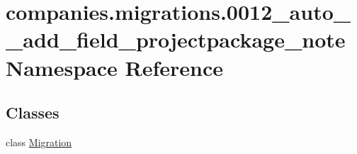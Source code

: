 \hypertarget{namespacecompanies_1_1migrations_1_10012__auto____add__field__projectpackage__note}{\section{companies.\-migrations.0012\-\_\-auto\-\_\-\-\_\-add\-\_\-field\-\_\-projectpackage\-\_\-note Namespace Reference}
\label{namespacecompanies_1_1migrations_1_10012__auto____add__field__projectpackage__note}
}
\subsection*{Classes}
\begin{DoxyCompactItemize}
\item 
class \hyperlink{classcompanies_1_1migrations_1_10012__auto____add__field__projectpackage__note_1_1_migration}{Migration}
\end{DoxyCompactItemize}
